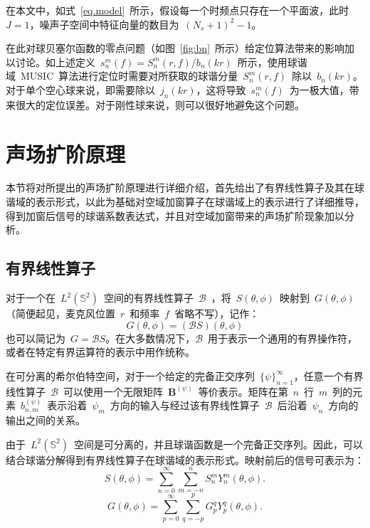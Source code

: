 在本文中，如式~\eqref{eq.model}~所示，假设每一个时频点只存在一个平面波，此时~$J=1$，噪声子空间中特征向量的数目为~$(N_{s}+1)^2-1 $。

在此对球贝塞尔函数的零点问题（如图~\ref{fig:bn}~所示）给定位算法带来的影响加以讨论。如上述定义~$s_n ^m(f) = S_n ^m(r,f) / b_n(kr)$~所示，使用球谐域~MUSIC~算法进行定位时需要对所获取的球谐分量~$S_n ^m(r,f)$~除以~$b_{n}(kr)$。对于单个空心球来说，即需要除以~$j_{n}(kr)$，这将导致~$s_n ^m(f)$~为一极大值，带来很大的定位误差。对于刚性球来说，则可以很好地避免这个问题。


\section{声场扩阶原理}

本节将对所提出的声场扩阶原理进行详细介绍，首先给出了有界线性算子及其在球谐域的表示形式，以此为基础对空域加窗算子在球谐域上的表示进行了详细推导，得到加窗后信号的球谐系数表达式，并且对空域加窗带来的声场扩阶现象加以分析。

\subsection{有界线性算子}
对于一个在~$L^{2}(\mathbb{S}^{2})$~空间的有界线性算子~$\mathcal{B}$~，将~$S(\theta,\phi)$~映射到~$G(\theta,\phi)$（简便起见，麦克风位置~$r$~和频率~$f$~省略不写），记作：
\begin{equation}
G(\theta,\phi) = \left(\mathcal{B} S\right) (\theta,\phi)
\end{equation}
也可以简记为~$G = \mathcal{B} S $。在大多数情况下，$\mathcal{B}$~用于表示一个通用的有界操作符，或者在特定有界运算符的表示中用作统称。

在可分离的希尔伯特空间，对于一个给定的完备正交序列~$\{\psi\}_{n=1}^{\infty}$，任意一个有界线性算子~$\mathcal{B}$~可以使用一个无限矩阵~$\mathbf{B}^{(\psi)}$~等价表示。矩阵在第~$n$~行~$m$~列的元素~$b_{n,m}^{(\psi)}$~表示沿着~$\psi_{m}$~方向的输入与经过该有界线性算子~$\mathcal{B}$~后沿着~$\psi_{n}$~方向的输出之间的关系。

由于~$L^{2}(\mathbb{S}^{2})$~空间是可分离的，并且球谐函数是一个完备正交序列。因此，可以结合球谐分解得到有界线性算子在球谐域的表示形式。映射前后的信号可表示为：
\begin{equation}\label{S_pq_infty}
S(\theta,\phi) = \sum_{n=0}^{\infty}\sum_{m=-n}^{n} S_{n}^{m} Y_{n}^{m}(\theta,\phi).
\end{equation}
\begin{equation}\label{G_lm_infty}
G(\theta,\phi) =  \sum_{p=0}^{\infty} \sum_{q=-p}^{p} G_{p}^{q} Y_{p}^{q}(\theta,\phi).
\end{equation}

